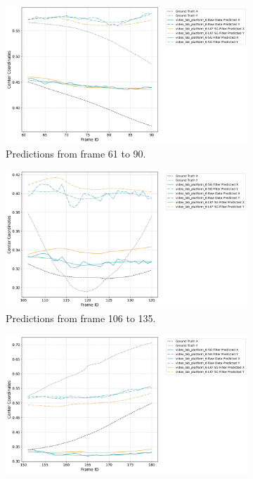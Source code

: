 \documentclass[12pt,oneside]{book} %
\begin{document}
\begin{figure}[H]
    \centering
    \begin{subfigure}[t]{0.8\textwidth}
        \includegraphics[width=\textwidth]{figures/video_lab_platform_6_Group_1_Trajectories.png}
        \caption{Predictions from frame 61 to 90.}
        \label{fig:framework-video_lab_platform_6-1}
    \end{subfigure}
    \hfill
    \begin{subfigure}[t]{0.8\textwidth}
        \includegraphics[width=\textwidth]{figures/video_lab_platform_6_Group_2_Trajectories.png}
        \caption{Predictions from frame 106 to 135.}
        \label{fig:framework-video_lab_platform_6-2}
    \end{subfigure}
    \vfill
    \begin{subfigure}[t]{0.8\textwidth}
        \includegraphics[width=\textwidth]{figures/video_lab_platform_6_Group_3_Trajectories.png}

\end{subfigure}
\end{figure}
\end{document}
